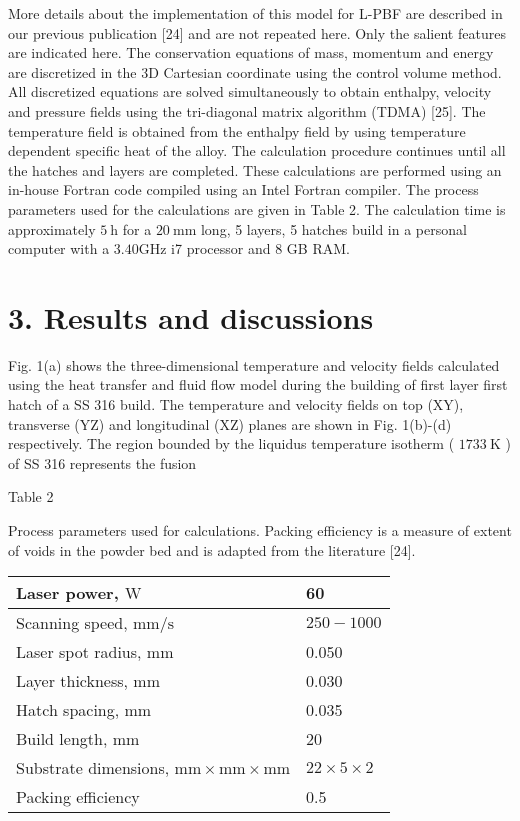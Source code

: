 \documentclass[10pt]{article}
\begin{document}
More details about the implementation of this model for L-PBF are described in our previous publication [24] and are not repeated here. Only the salient features are indicated here. The conservation equations of mass, momentum and energy are discretized in the 3D Cartesian coordinate using the control volume method. All discretized equations are solved simultaneously to obtain enthalpy, velocity and pressure fields using the tri-diagonal matrix algorithm (TDMA) [25]. The temperature field is obtained from the enthalpy field by using temperature dependent specific heat of the alloy. The calculation procedure continues until all the hatches and layers are completed. These calculations are performed using an in-house Fortran code compiled using an Intel Fortran compiler. The process parameters used for the calculations are given in Table 2. The calculation time is approximately $5 \mathrm{~h}$ for a $20 \mathrm{~mm}$ long, 5 layers, 5 hatches build in a personal computer with a $3.40 \mathrm{GHz}$ i7 processor and 8 GB RAM.

\section*{3. Results and discussions}
Fig. 1(a) shows the three-dimensional temperature and velocity fields calculated using the heat transfer and fluid flow model during the building of first layer first hatch of a SS 316 build. The temperature and velocity fields on top (XY), transverse (YZ) and longitudinal (XZ) planes are shown in Fig. 1(b)-(d) respectively. The region bounded by the liquidus temperature isotherm ( $1733 \mathrm{~K}$ ) of SS 316 represents the fusion

Table 2

Process parameters used for calculations. Packing efficiency is a measure of extent of voids in the powder bed and is adapted from the literature [24].

\begin{center}
\begin{tabular}{ll}
\hline
Laser power, $\mathrm{W}$ & 60 \\
\hline
Scanning speed, $\mathrm{mm} / \mathrm{s}$ & $250-1000$ \\
Laser spot radius, $\mathrm{mm}$ & 0.050 \\
Layer thickness, $\mathrm{mm}$ & 0.030 \\
Hatch spacing, $\mathrm{mm}$ & 0.035 \\
Build length, $\mathrm{mm}$ & 20 \\
Substrate dimensions, $\mathrm{mm} \times \mathrm{mm} \times \mathrm{mm}$ & $22 \times 5 \times 2$ \\
Packing efficiency & 0.5 \\
\end{tabular}
\end{center}
\end{document}
